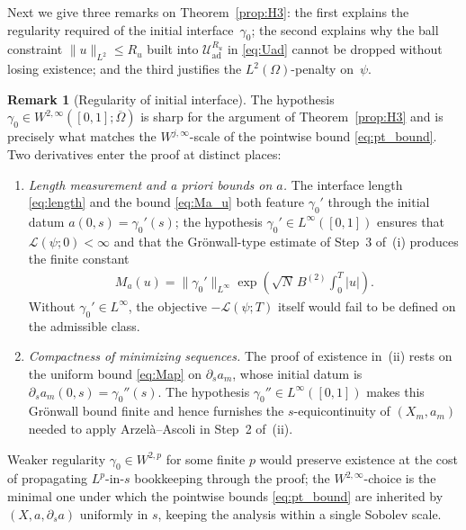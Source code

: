 \documentclass[12pt, reqno]{amsart}
\theoremstyle{plain}
\theoremstyle{definition}
\newtheorem{remark}[thm]{Remark}
\numberwithin{equation}{section}
\numberwithin{figure}{section}
\numberwithin{algorithm}{section}
\begin{document}
Next we give three remarks on Theorem~\ref{prop:H3}: the first explains the regularity required of the initial interface~$\gamma_0$; the second explains why the ball constraint $\|u\|_{L^2}\le R_u$ built into $\mathcal U_{\mathrm{ad}}^{R_u}$ in \eqref{eq:Uad} cannot be dropped without losing existence; and the third justifies the $L^2(\Omega)$-penalty on~$\psi$.

\begin{remark}[Regularity of initial interface]\label{rem:gamma0_reg}
The hypothesis $\gamma_0\in W^{2,\infty}([0,1];\overline\Omega)$ is sharp for the argument of Theorem~\ref{prop:H3} and is precisely what matches the $W^{j,\infty}$-scale of the pointwise bound \eqref{eq:pt_bound}. Two derivatives enter the proof at distinct places:
\begin{enumerate}
\item \emph{Length measurement and a priori bounds on $a$.} The interface length \eqref{eq:length} and the bound \eqref{eq:Ma_u} both feature $\gamma_0'$ through the initial datum $a(0,s)=\gamma_0'(s)$; the hypothesis $\gamma_0'\in L^\infty([0,1])$ ensures that $\mathcal L(\psi;0)<\infty$ and that the Gr\"onwall-type estimate of Step~3 of~(i) produces the finite constant 
	\begin{align*}
		M_a(u)=\|\gamma_0'\|_{L^\infty}\exp(\sqrt N\,B^{(2)}\int_0^T|u|).
	\end{align*}
	Without $\gamma_0'\in L^\infty$, the objective $-\mathcal L(\psi;T)$ itself would fail to be defined on the admissible class.
\item \emph{Compactness of minimizing sequences.} The proof of existence in~(ii) rests on the uniform bound \eqref{eq:Map} on $\partial_s a_m$, whose initial datum is $\partial_s a_m(0,s)=\gamma_0''(s)$. The hypothesis $\gamma_0''\in L^\infty([0,1])$ makes this Gr\"onwall bound finite and hence furnishes the $s$-equicontinuity of $(X_m,a_m)$ needed to apply Arzel\`a--Ascoli in Step~2 of~(ii).
\end{enumerate}
Weaker regularity $\gamma_0\in W^{2,p}$ for some finite $p$ would preserve existence at the cost of propagating $L^p$-in-$s$ bookkeeping through the proof; the $W^{2,\infty}$-choice is the minimal one under which the pointwise bounds \eqref{eq:pt_bound} are inherited by $(X,a,\partial_s a)$ uniformly in $s$, keeping the analysis within a single Sobolev scale.
\end{remark}
\end{document}
